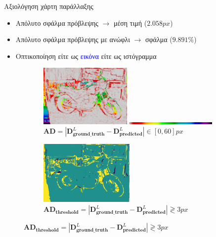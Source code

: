\documentclass[english,greek]{beamer}
\begin{document}
\begin{frame}[t]{Αξιολόγηση χάρτη παράλλαξης}
\fontsize{10}{7.2}\selectfont
\begin{itemize}
	\item Απόλυτο σφάλμα πρόβλεψης $\rightarrow$ μέση τιμή ($2.058 px$)
	\item Απόλυτο σφάλμα πρόβλεψης με ανώφλι $\rightarrow$ σφάλμα ($9.891 \%$)
	\item Οπτικοποίηση είτε ως \textcolor{blue}{εικόνα} είτε ως ιστόγραμμα
\end{itemize}
\begin{figure}
	\begin{subfigure}{0.49\textwidth}
		\includegraphics[width=\textwidth, height=30mm]{motorcycle_dist_error.png}
		
		\includegraphics[width=\textwidth, height=1mm]{error_colorbar.png}
		\caption{\fontsize{7}{7}\selectfont $\mathbf{AD} = |\mathbf{D}_{\mathbf{ground\_truth}}^L - \mathbf{D}_{\mathbf{predicted}}^L| \in [0,60]px$}
	\end{subfigure}
	\begin{subfigure}{0.49\textwidth}
		\includegraphics[width=\textwidth, height=31mm]{motorcycle_error.png}
		\caption{\fontsize{6.5}{7} $\mathbf{AD_{threshold}} = |\mathbf{D}_{\mathbf{ground\_truth}}^L - \mathbf{D}_{\mathbf{predicted}}^L| \gtrless 3px$}
	\end{subfigure}

\end{figure}
\end{frame}
\end{document}
